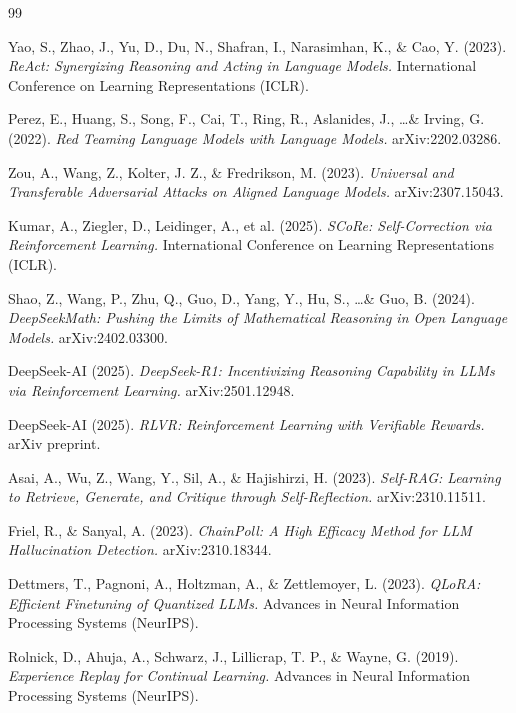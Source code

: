 \documentclass[11pt,a4paper]{article}
\begin{document}

\begin{thebibliography}{99}

Yao, S., Zhao, J., Yu, D., Du, N., Shafran, I., Narasimhan, K., \& Cao, Y. (2023).
\emph{ReAct: Synergizing Reasoning and Acting in Language Models.}
International Conference on Learning Representations (ICLR).

Perez, E., Huang, S., Song, F., Cai, T., Ring, R., Aslanides, J., \ldots \& Irving, G. (2022).
\emph{Red Teaming Language Models with Language Models.}
arXiv:2202.03286.

Zou, A., Wang, Z., Kolter, J. Z., \& Fredrikson, M. (2023).
\emph{Universal and Transferable Adversarial Attacks on Aligned Language Models.}
arXiv:2307.15043.

Kumar, A., Ziegler, D., Leidinger, A., et al. (2025).
\emph{SCoRe: Self-Correction via Reinforcement Learning.}
International Conference on Learning Representations (ICLR).

Shao, Z., Wang, P., Zhu, Q., Guo, D., Yang, Y., Hu, S., \ldots \& Guo, B. (2024).
\emph{DeepSeekMath: Pushing the Limits of Mathematical Reasoning in Open Language Models.}
arXiv:2402.03300.

DeepSeek-AI (2025).
\emph{DeepSeek-R1: Incentivizing Reasoning Capability in LLMs via Reinforcement Learning.}
arXiv:2501.12948.

DeepSeek-AI (2025).
\emph{RLVR: Reinforcement Learning with Verifiable Rewards.}
arXiv preprint.

Asai, A., Wu, Z., Wang, Y., Sil, A., \& Hajishirzi, H. (2023).
\emph{Self-RAG: Learning to Retrieve, Generate, and Critique through Self-Reflection.}
arXiv:2310.11511.

Friel, R., \& Sanyal, A. (2023).
\emph{ChainPoll: A High Efficacy Method for LLM Hallucination Detection.}
arXiv:2310.18344.

Dettmers, T., Pagnoni, A., Holtzman, A., \& Zettlemoyer, L. (2023).
\emph{QLoRA: Efficient Finetuning of Quantized LLMs.}
Advances in Neural Information Processing Systems (NeurIPS).

Rolnick, D., Ahuja, A., Schwarz, J., Lillicrap, T. P., \& Wayne, G. (2019).
\emph{Experience Replay for Continual Learning.}
Advances in Neural Information Processing Systems (NeurIPS).


\end{thebibliography}
\end{document}
